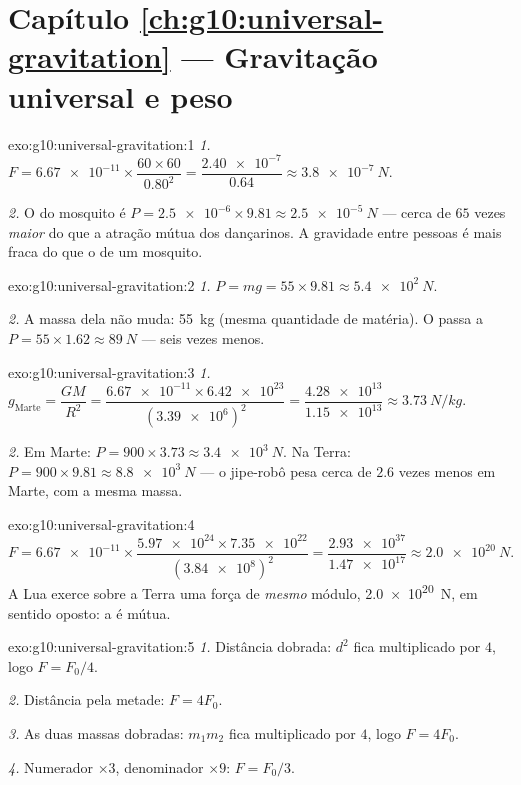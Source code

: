 \section*{Capítulo \ref{ch:g10:universal-gravitation} --- Gravitação universal e peso}

\begin{solution}{exo:g10:universal-gravitation:1}
\emph{1.} $F = \num{6.67e-11} \times \dfrac{60 \times 60}{0.80^2}
= \dfrac{\num{2.40e-7}}{0.64} \approx \qty{3.8e-7}{N}$.

\emph{2.} O  do mosquito é
$P = \num{2.5e-6} \times 9.81 \approx \qty{2.5e-5}{N}$ --- cerca de $65$
vezes \emph{maior} do que a atração mútua dos dançarinos. A gravidade
entre pessoas é mais fraca do que o  de um mosquito.
\end{solution}

\begin{solution}{exo:g10:universal-gravitation:2}
\emph{1.} $P = mg = 55 \times 9.81 \approx \qty{5.4e2}{N}$.

\emph{2.} A massa dela não muda: \qty{55}{kg} (mesma quantidade de
matéria). O  passa a
$P = 55 \times 1.62 \approx \qty{89}{N}$ --- seis vezes menos.
\end{solution}

\begin{solution}{exo:g10:universal-gravitation:3}
\emph{1.} $g_{\text{Marte}} = \dfrac{G M}{R^2}
= \dfrac{\num{6.67e-11} \times \num{6.42e23}}{(\num{3.39e6})^2}
= \dfrac{\num{4.28e13}}{\num{1.15e13}} \approx \qty{3.73}{N/kg}$.

\emph{2.} Em Marte: $P = 900 \times 3.73 \approx \qty{3.4e3}{N}$. Na
Terra: $P = 900 \times 9.81 \approx \qty{8.8e3}{N}$ --- o jipe-robô pesa
cerca de $2.6$ vezes menos em Marte, com a mesma massa.
\end{solution}

\begin{solution}{exo:g10:universal-gravitation:4}
\[
F = \num{6.67e-11} \times
\frac{\num{5.97e24} \times \num{7.35e22}}{(\num{3.84e8})^2}
= \frac{\num{2.93e37}}{\num{1.47e17}}
\approx \qty{2.0e20}{N}.
\]
A Lua exerce sobre a Terra uma força de \emph{mesmo} módulo,
\qty{2.0e20}{N}, em sentido oposto: a  é mútua.
\end{solution}

\begin{solution}{exo:g10:universal-gravitation:5}
\emph{1.} Distância dobrada: $d^2$ fica multiplicado por $4$, logo
$F = F_0/4$.

\emph{2.} Distância pela metade: $F = 4F_0$.

\emph{3.} As duas massas dobradas: $m_1 m_2$ fica multiplicado por $4$,
logo $F = 4F_0$.

\emph{4.} Numerador $\times 3$, denominador $\times 9$: $F = F_0/3$.
\end{solution}

